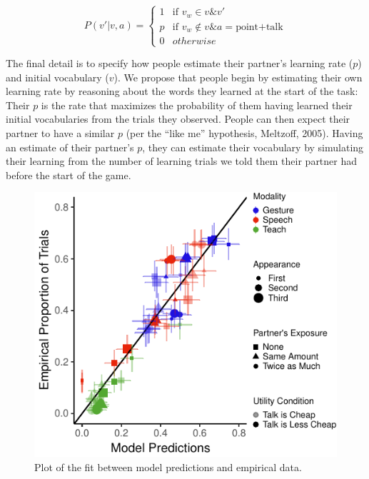 \documentclass[10pt, letterpaper]{article}
\newenvironment{CodeChunk}{}{}
\begin{document}
\[
P\left(v'|v,a\right)= \begin{cases} 
1 & \text{if } v_{w} \in v \& v'\\ 
p & \text{if } v_{w} \notin v \& a = \text{point+talk}\\ 
0 & otherwise\end{cases}
\]

The final detail is to specify how people estimate their partner's
learning rate (\(p\)) and initial vocabulary (\(v\)). We propose that
people begin by estimating their own learning rate by reasoning about
the words they learned at the start of the task: Their \(p\) is the rate
that maximizes the probability of them having learned their initial
vocabularies from the trials they observed. People can then expect their
partner to have a similar \(p\) (per the ``like me'' hypothesis,
Meltzoff, 2005). Having an estimate of their partner's \(p\), they can
estimate their vocabulary by simulating their learning from the number
of learning trials we told them their partner had before the start of
the game.

\begin{CodeChunk}
\begin{figure}[H]

{\centering \includegraphics{figs/model_fit-1} 

}

\caption[Plot of the fit between model predictions and empirical data]{Plot of the fit between model predictions and empirical data.}\label{fig:model_fit}
\end{figure}
\end{CodeChunk}
\end{document}
